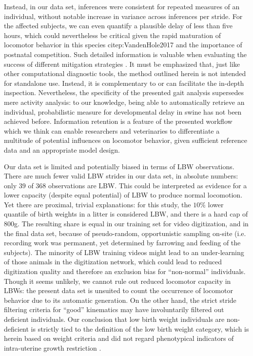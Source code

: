 \documentclass[10pt,a4paper]{article}
\begin{document}
Instead, in our data set, inferences were consistent for repeated measures of an individual, without notable increase in variance across inferences per stride.
For the affected subjects, we can even quantify a plausible delay of less than five hours, which could nevertheless be critical given the rapid maturation of locomotor behavior in this species citep:VandenHole2017 and the importance of postnatal competition.
Such detailed information is valuable when evaluating the success of different mitigation strategies \citep[e.g. supplementing energy to piglets,][]{Schmitt2019}.
It must be emphasized that, just like other computational diagnostic tools, the method outlined herein is not intended for standalone use.
Instead, it is complementary to or can facilitate the in-depth inspection.
Nevertheless, the specificity of the presented gait analysis supersedes mere activity analysis: to our knowledge, being able to automatically retrieve an individual, probabilistic measure for developmental delay in swine has not been achieved before.
Information retention is a feature of the presented workflow which we think can enable researchers and veterinaries to differentiate a multitude of potential influences on locomotor behavior, given sufficient reference data and an appropriate model design.


\bigskip
Our data set is limited and potentially biased in terms of LBW observations.
There are much fewer valid LBW strides in our data set, in absolute numbers: only
\(39\)
of
\(368\)
observations are LBW.
This could be interpreted as evidence for a lower capacity (despite equal potential) of LBW to produce normal locomotion.
Yet there are proximal, trivial explanations: for this study, the \(10 \%\) lower quantile of birth weights in a litter is considered LBW, and there is a hard cap of \(800\)g.
The resulting share is equal in our training set for video digitization, and in the final data set, because of pseudo-random, opportunistic sampling on-site (i.e. recording work was permanent, yet determined by farrowing and feeding of the subjects).
The minority of LBW training videos might lead to an under-learning of those animals in the digitization network, which could lead to reduced digitization quality and therefore an exclusion bias for ``non-normal'' individuals.
Though it seems unlikely, we cannot rule out reduced locomotor capacity in LBWs: the present data set is unsuited to count the occurrence of locomotor behavior due to its automatic generation.
On the other hand, the strict stride filtering criteria for ``good'' kinematics may have involuntarily filtered out deficient individuals.
Our conclusion that low birth weight individuals are non-deficient is strictly tied to the definition of the low birth weight category, which is herein based on weight criteria and did not regard phenotypical indicators of intra-uterine growth restriction \citep[which we did not record, \textit{cf.}][]{Amdi2013}.
\end{document}
